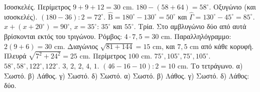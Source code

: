  Ισοσκελές. Περίμετρος $9+9+12=30$ cm.
 $180-(58+64)=58^\circ$. Οξυγώνιο (και ισοσκελές).
 $(180-36):2=72^\circ$.
 $\hat{\mathrm{Β}}=180^\circ-130^\circ=50^\circ$ και $\hat{\Gamma}=130^\circ-45^\circ=85^\circ$.
 $x+(x+20^\circ)=90^\circ$, $x=35^\circ$: $35^\circ$ και $55^\circ$.
 Τρία. Στο αμβλυγώνιο δύο από αυτά βρίσκονται εκτός του τριγώνου.
 Ρόμβος: $4\cdot7{,}5=30$ cm. Παραλληλόγραμμο: $2(9+6)=30$ cm.
 Διαγώνιος $\sqrt{81+144}=15$ cm, και $7{,}5$ cm από κάθε κορυφή.
 Πλευρά $\sqrt{7^2+24^2}=25$ cm. Περίμετρος $100$ cm.
 $75^\circ,105^\circ,75^\circ,105^\circ$.
 $58^\circ,58^\circ,122^\circ,122^\circ$.
 $3$, $2$, $2$, $4$, $1$.
 $(46-16-10):2=10$ cm.
 Το τετράγωνο.
 α) Σωστό. β) Λάθος. γ) Σωστό. δ) Σωστό.
 α) Σωστό. β) Λάθος. γ) Σωστό. δ) Λάθος: δύο.
